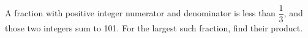A fraction with positive integer numerator and denominator is less than $\dfrac{1}{3}$, and those two integers sum to 101. For the largest such fraction, find their product.
